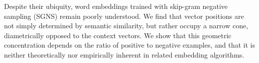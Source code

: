 Despite their ubiquity, word embeddings trained with skip-gram negative sampling (SGNS) remain poorly understood. We find that vector positions are not simply determined by semantic similarity, but rather occupy a narrow cone, diametrically opposed to the context vectors. We show that this geometric concentration depends on the ratio of positive to negative examples, and that it is neither theoretically nor empirically inherent in related embedding algorithms.
